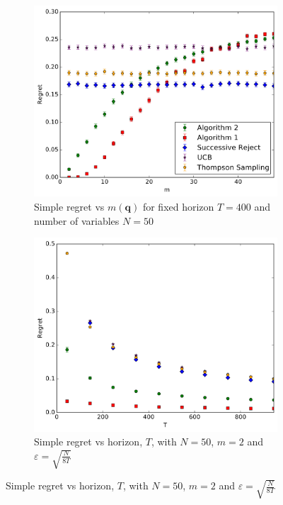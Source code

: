 \documentclass[11pt,a4paper,oneside]{book}
\theoremstyle{plain}
\theoremstyle{definition}
\let\epsilon\varepsilon
\begin{document}
\begin{figure}[h]
    \begin{subfigure}[t]{0.3\textwidth}
		\centering    
    		\includegraphics[width=\textwidth]{experiment1_20161020_1247.pdf}
    		\caption{Simple regret vs $m(\boldsymbol{q})$ for fixed horizon $T=400$ and number of variables $N = 50$}
        \label{fig:simple_vs_m}
    \end{subfigure}\hfill
    \begin{subfigure}[t]{0.3\textwidth}
    		\centering
        \includegraphics[width=\textwidth]{experiment2_20161020_1249.pdf}
    		\caption{Simple regret vs horizon, $T$, with $N = 50$, $m=2$ and $\epsilon = \sqrt{\frac{N}{8T}}$}

\end{subfigure}
\end{figure}
\end{document}
